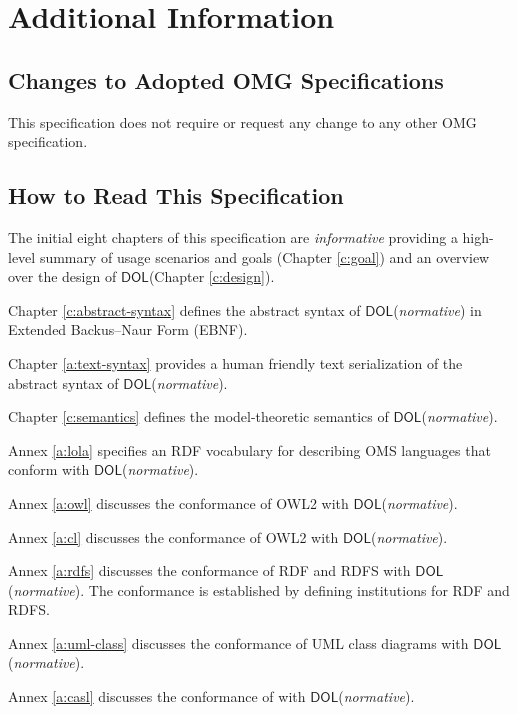 \documentclass[10pt,fleqn,%
\ifpretendfinal
final%
\else
draft%
\fi,
]{scrreprt}
\newcommand*{\DOL}{\ensuremath{\mathsf{DOL}}\xspace}
\begin{document}
\chapter{Additional Information}
\section{Changes to Adopted OMG Specifications}
This specification does not require or request any change to any other OMG specification. 

\section{How to Read This Specification}
The initial eight chapters of this specification are \emph{informative} providing  a high-level
 summary of usage scenarios and goals (Chapter \ref{c:goal}) and an overview over the design of
\DOL  (Chapter \ref{c:design}).

\medskip \noindent 
Chapter \ref{c:abstract-syntax} defines the abstract syntax of \DOL (\emph{normative}) in Extended
Backus–Naur Form (EBNF).  

\medskip \noindent 
Chapter \ref{a:text-syntax} provides a human friendly text serialization of the abstract syntax of 
\DOL (\emph{normative}). 

\medskip \noindent 
Chapter \ref{c:semantics} defines the model-theoretic semantics of \DOL (\emph{normative}). 

\medskip \noindent 
Annex \ref{a:lola} specifies an RDF vocabulary for describing OMS languages that 
conform with \DOL  (\emph{normative}). 

\medskip \noindent 
Annex \ref{a:owl} discusses the conformance of OWL2 with \DOL  (\emph{normative}). 

\medskip \noindent 
Annex \ref{a:cl} discusses the conformance of OWL2 with \DOL  (\emph{normative}). 

\medskip \noindent 
Annex \ref{a:rdfs} discusses the conformance of RDF and RDFS with \DOL  (\emph{normative}). The
 conformance is established by defining institutions for RDF and RDFS. 

\medskip \noindent 
Annex \ref{a:uml-class} discusses the conformance of UML class diagrams with \DOL 
 (\emph{normative}).

\medskip \noindent 
Annex \ref{a:casl} discusses the conformance of \CASL with \DOL  (\emph{normative}).
\end{document}
